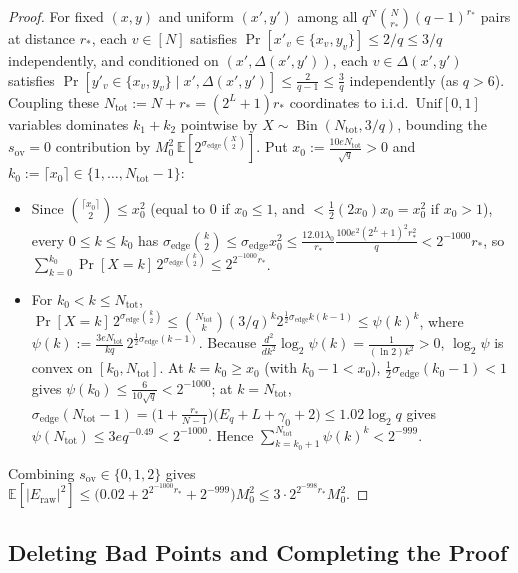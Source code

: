 \documentclass[11pt]{article}
\theoremstyle{definition}
\theoremstyle{remark}
\newcommand{\Bin}{\operatorname{Bin}}
\begin{document}
\begin{proof}
For fixed $(x, y)$ and uniform $(x', y')$ among all $q^N \binom{N}{r_*}(q - 1)^{r_*}$ pairs at distance $r_*$, each $v \in [N]$ satisfies $\Pr[x'_v \in \{x_v, y_v\}] \le 2/q \le 3/q$ independently, and conditioned on $(x', \Delta(x', y'))$, each $v \in \Delta(x', y')$ satisfies $\Pr[y'_v \in \{x_v, y_v\} \mid x', \Delta(x', y')] \le \frac{2}{q - 1} \le \frac{3}{q}$ independently (as $q > 6$). Coupling these $N_{\mathrm{tot}} := N + r_* = (2^L + 1) r_*$ coordinates to i.i.d.\ $\mathrm{Unif}[0, 1]$ variables dominates $k_1 + k_2$ pointwise by $X \sim \Bin(N_{\mathrm{tot}}, 3/q)$, bounding the $s_{\mathrm{ov}} = 0$ contribution by $M_0^2\,\mathbb{E}[2^{\sigma_{\mathrm{edge}} \binom{X}{2}}]$. Put $x_0 := \frac{10 e N_{\mathrm{tot}}}{\sqrt{q}} > 0$ and $k_0 := \lceil x_0 \rceil \in \{1, \dots, N_{\mathrm{tot}} - 1\}$:
\begin{itemize}[leftmargin=2em,nosep]
  \item Since $\binom{\lceil x_0 \rceil}{2} \le x_0^2$ (equal to $0$ if $x_0 \le 1$, and $< \frac{1}{2}(2 x_0) x_0 = x_0^2$ if $x_0 > 1$), every $0 \le k \le k_0$ has $\sigma_{\mathrm{edge}}\binom{k}{2} \le \sigma_{\mathrm{edge}} x_0^2 \le \frac{12.01 \lambda_0}{r_*} \frac{100 e^2 (2^L + 1)^2 r_*^2}{q} < 2^{-1000} r_*$, so $\sum_{k=0}^{k_0} \Pr[X = k]\,2^{\sigma_{\mathrm{edge}}\binom{k}{2}} \le 2^{2^{-1000} r_*}$.
  \item For $k_0 < k \le N_{\mathrm{tot}}$, $\Pr[X = k]\,2^{\sigma_{\mathrm{edge}}\binom{k}{2}} \le \binom{N_{\mathrm{tot}}}{k}(3/q)^k 2^{\frac{1}{2}\sigma_{\mathrm{edge}} k(k - 1)} \le \psi(k)^k$, where $\psi(k) := \frac{3 e N_{\mathrm{tot}}}{k q}\,2^{\frac{1}{2}\sigma_{\mathrm{edge}}(k - 1)}$. Because $\frac{d^2}{dk^2}\log_2 \psi(k) = \frac{1}{(\ln 2)k^2} > 0$, $\log_2 \psi$ is convex on $[k_0, N_{\mathrm{tot}}]$. At $k = k_0 \ge x_0$ (with $k_0 - 1 < x_0$), $\frac{1}{2}\sigma_{\mathrm{edge}}(k_0 - 1) < 1$ gives $\psi(k_0) \le \frac{6}{10\sqrt{q}} < 2^{-1000}$; at $k = N_{\mathrm{tot}}$, $\sigma_{\mathrm{edge}}(N_{\mathrm{tot}} - 1) = \bigl(1 + \frac{r_*}{N - 1}\bigr)\bigl(E_q + L + \gamma_0 + 2\bigr) \le 1.02 \log_2 q$ gives $\psi(N_{\mathrm{tot}}) \le 3 e q^{-0.49} < 2^{-1000}$. Hence $\sum_{k=k_0+1}^{N_{\mathrm{tot}}} \psi(k)^k < 2^{-999}$.
\end{itemize}
Combining $s_{\mathrm{ov}} \in \{0, 1, 2\}$ gives $\mathbb{E}[|E_{\mathrm{raw}}|^2] \le \bigl(0.02 + 2^{2^{-1000} r_*} + 2^{-999}\bigr) M_0^2 \le 3 \cdot 2^{2^{-998} r_*} M_0^2$.
\end{proof}

\subsection{Deleting Bad Points and Completing the Proof}
\label{subsec:deletion}
\end{document}
